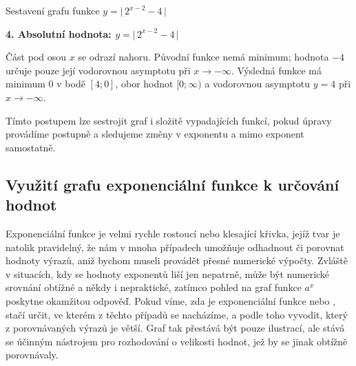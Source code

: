 \documentclass[12pt,a4paper]{article}
\begin{document}
\begin{examplebox}{Sestavení grafu funkce $y = \big|\,2^{x-2} - 4\,\big|$}

\textbf{4. Absolutní hodnota: $y=\big|\,2^{x-2}-4\,\big|$}

Část pod osou $x$ se odrazí nahoru. Původní funkce nemá minimum;
hodnota $-4$ určuje pouze její vodorovnou asymptotu při $x\to-\infty$.
Výsledná funkce má minimum $0$ v bodě $[4;0]$, obor hodnot $[0;\infty)$
a vodorovnou asymptotu $y=4$ při $x\to-\infty$.

\begin{center}
\end{center}

Tímto postupem lze sestrojit graf i složitě vypadajících funkcí,
pokud úpravy provádíme postupně a sledujeme změny v exponentu
a mimo exponent samostatně.
\end{examplebox}


\subsection*{Využití grafu exponenciální funkce k určování hodnot}
Exponenciální funkce je velmi rychle rostoucí nebo klesající křivka, jejíž tvar je natolik
pravidelný, že nám v mnoha případech umožňuje odhadnout či porovnat hodnoty výrazů,
aniž bychom museli provádět přesné numerické výpočty. Zvláště v situacích,
kdy se hodnoty exponentů liší jen nepatrně, může být numerické srovnání obtížné
a někdy i nepraktické, zatímco pohled na graf funkce $a^{x}$ poskytne okamžitou
odpověď. Pokud víme, zda je exponenciální funkce  nebo ,
stačí určit, ve kterém z těchto případů se nacházíme, a podle toho vyvodit,
který z porovnávaných výrazů je větší. Graf tak přestává být pouze ilustrací,
ale stává se účinným nástrojem pro rozhodování o velikosti hodnot,
jež by se jinak obtížně porovnávaly.
\end{document}
